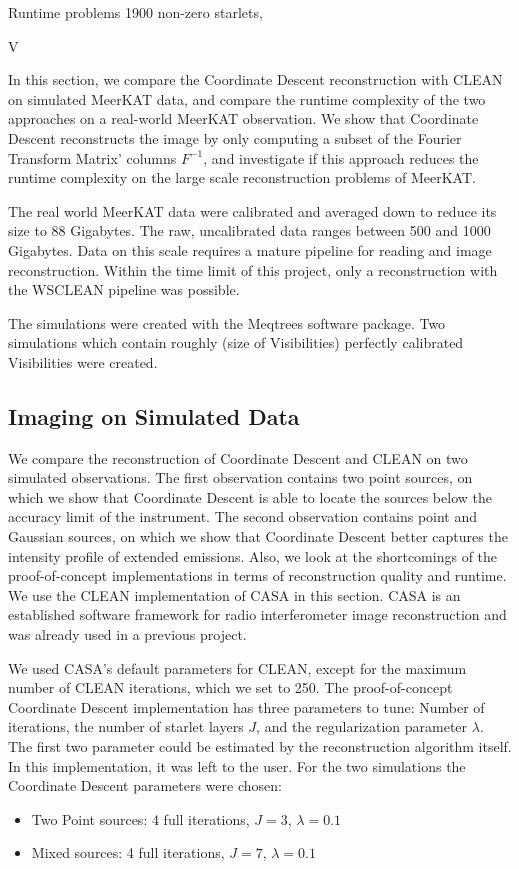 Runtime problems
1900 non-zero starlets, 


V

In this section, we compare the Coordinate Descent reconstruction with CLEAN on simulated MeerKAT data, and compare the runtime complexity of the two approaches on a real-world MeerKAT observation. We show that Coordinate Descent reconstructs the image by only computing a subset of the Fourier Transform Matrix' columns $F^{-1}$, and investigate if this approach reduces the runtime complexity on the large scale reconstruction problems of MeerKAT.


The real world MeerKAT data were calibrated and averaged down to reduce its size to 88 Gigabytes. The raw, uncalibrated data ranges between 500 and 1000 Gigabytes. Data on this scale requires a mature pipeline for reading and image reconstruction. Within the time limit of this project, only a reconstruction with the WSCLEAN\cite{offringa2014wsclean} pipeline was possible.

The simulations were created with the Meqtrees software package. Two simulations which contain roughly (size of Visibilities) perfectly calibrated Visibilities were created. 

\subsection{Imaging on Simulated Data}
We compare the reconstruction of Coordinate Descent and CLEAN on two simulated observations. The first observation contains two point sources, on which we show that Coordinate Descent is able to locate the sources below the accuracy limit of the instrument. The second observation contains point and Gaussian sources, on which we show that Coordinate Descent better captures the intensity profile of extended emissions. Also, we look at the shortcomings of the proof-of-concept implementations in terms of reconstruction quality and runtime. We use the CLEAN implementation of CASA in this section. CASA is an established software framework for radio interferometer image reconstruction and was already used in a previous project.


We used CASA's default parameters for CLEAN, except for the maximum number of CLEAN iterations, which we set to 250. The proof-of-concept Coordinate Descent implementation has three parameters to tune: Number of iterations, the number of starlet layers $J$, and the regularization parameter $\lambda$. The first two parameter could be estimated by the reconstruction algorithm itself. In this implementation, it was left to the user. For the two simulations the Coordinate Descent parameters were chosen:
\begin{itemize}
	\item Two Point sources: 4 full iterations, $J=3$, $\lambda=0.1$
	\item Mixed sources: 4 full iterations, $J=7$, $\lambda=0.1$
\end{itemize}

